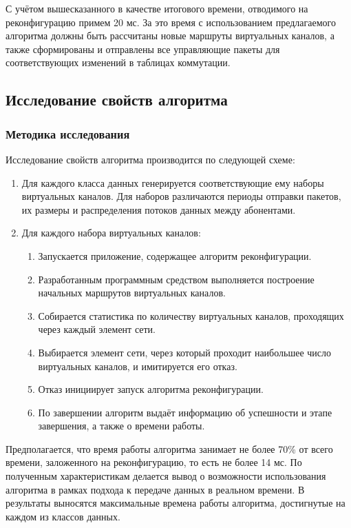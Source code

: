 \documentclass[12pt, a4paper]{article}
\begin{document}
С учётом вышесказанного в качестве итогового времени, отводимого на реконфигурацию примем 20 мс. За это время с использованием предлагаемого алгоритма должны быть рассчитаны новые маршруты виртуальных каналов, а также сформированы и отправлены все управляющие пакеты для соответствующих изменений в таблицах коммутации.

\subsection{Исследование свойств алгоритма}
\subsubsection{Методика исследования}
Исследование свойств алгоритма производится по следующей схеме:
\begin{enumerate}
	\item Для каждого класса данных генерируется соответствующие ему наборы виртуальных каналов. Для наборов различаются периоды отправки пакетов, их размеры и распределения потоков данных между абонентами.
	\item Для каждого набора виртуальных каналов:
	\begin{enumerate}
		\item Запускается приложение, содержащее алгоритм реконфигурации.
		\item Разработанным программным средством выполняется построение начальных маршрутов виртуальных каналов.
		\item Собирается статистика по количеству виртуальных каналов, проходящих через каждый элемент сети.
		\item Выбирается элемент сети, через который проходит наибольшее число виртуальных каналов, и имитируется его отказ.
		\item Отказ инициирует запуск алгоритма реконфигурации.
		\item По завершении алгоритм выдаёт информацию об успешности и этапе завершения, а также о времени работы.
	\end{enumerate}
\end{enumerate}

Предполагается, что время работы алгоритма занимает не более 70\% от всего времени, заложенного на реконфигурацию, то есть не более 14 мс. По полученным характеристикам делается вывод о возможности использования алгоритма в рамках подхода к передаче данных в реальном времени. В результаты выносятся максимальные времена работы алгоритма, достигнутые на каждом из классов данных.
 
\end{document}
